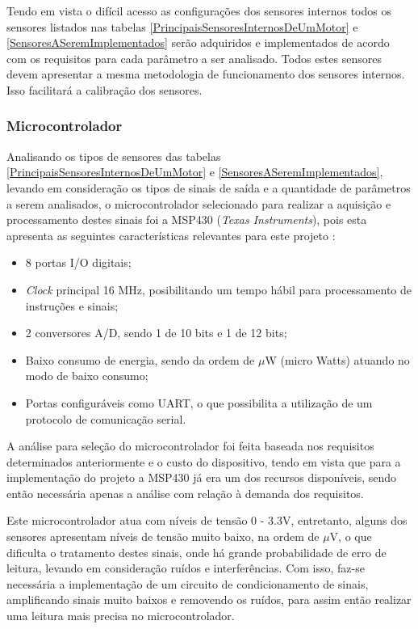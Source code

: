 Tendo em vista o difícil acesso as configurações dos sensores internos todos os sensores listados nas tabelas \ref{PrincipaisSensoresInternosDeUmMotor} e \ref{SensoresASeremImplementados} serão adquiridos e implementados de acordo com os requisitos para cada parâmetro a ser analisado. Todos estes sensores devem apresentar a mesma metodologia de funcionamento dos sensores internos. Isso facilitará a calibração dos sensores.

\subsubsection{Microcontrolador}

Analisando os tipos de sensores das tabelas \ref{PrincipaisSensoresInternosDeUmMotor} e \ref{SensoresASeremImplementados}, levando em consideração os tipos de sinais de saída e a quantidade de parâmetros a serem analisados, o microcontrolador selecionado para realizar a aquisição e processamento destes sinais foi a MSP430 (\textit{Texas Instruments}), pois esta apresenta as seguintes características relevantes para este projeto \cite{texas01}:

\begin{itemize}
	\item 8 portas I/O digitais;
	\item \textit{Clock} principal 16 MHz, posibilitando um tempo hábil para processamento de instruções e sinais;
	\item 2 conversores A/D, sendo 1 de 10 bits e 1 de 12 bits;
	\item Baixo consumo de energia, sendo da ordem de $\mu$W (micro Watts) atuando no modo de baixo consumo;
	\item Portas configuráveis como UART, o que possibilita a utilização de um protocolo de comunicação serial.
\end{itemize}

A análise para seleção do microcontrolador foi feita baseada nos requisitos determinados anteriormente e o custo do dispositivo, tendo em vista que para a implementação do projeto a MSP430 já era um dos recursos disponíveis, sendo então necessária apenas a análise com relação à demanda dos requisitos. 

Este microcontrolador atua com níveis de tensão 0 - 3.3V, entretanto, alguns dos sensores apresentam níveis de tensão muito baixo, na ordem de $\mu$V, o que dificulta o tratamento destes sinais, onde há grande probabilidade de erro de leitura, levando em consideração ruídos e interferências. Com isso, faz-se necessária a implementação de um circuito de condicionamento de sinais, amplificando sinais muito baixos e removendo os ruídos, para assim então realizar uma leitura mais precisa no microcontrolador.


